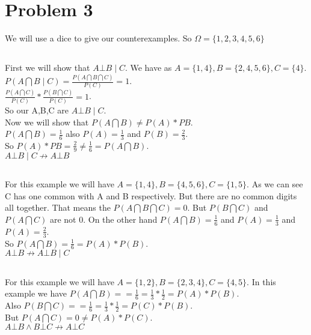 \section{Problem 3}
We will use a dice to give our counterexamples. So $\Omega = \{1,2,3,4,5,6\}$
\subsection{}
First we will show that $A\bot B \mid C$. We have as $A=\{1,4\}, B=\{2,4,5,6\}, C=\{4\}$.
$P(A\bigcap B\mid C) = \frac{P(A\bigcap B\bigcap C)}{P(C)} = 1$.\\
$\frac{P(A\bigcap C)}{P(C)} * \frac{P(B\bigcap C)}{P(C)} = 1$.\\
So our A,B,C are $A\bot B \mid C$.\\
Now we will show that $P(A\bigcap B) \neq P(A)*P{B}$.\\
$P(A\bigcap B) = \frac{1}{6}$ also $P(A) = \frac{1}{3}$ and $P(B)= \frac{2}{3}$.\\
So $P(A)*P{B} = \frac{2}{9} \neq \frac{1}{6} = P(A\bigcap B)$.\\
$A\bot B \mid C \not \rightarrow A\bot B$
\subsection{}
For this example we will have $A=\{1,4\}, B=\{4,5,6\}, C=\{1,5\}$.
As we can see C has one common with A and B respectively. But there are
no common digits all together. That means the $P(A\bigcap B\bigcap C) = 0$. But
$P(B\bigcap C)$ and $P(A\bigcap C)$ are not 0.
On the other hand $P(A\bigcap B) = \frac{1}{6}$ and $P(A) = \frac{1}{3}$ and $P(A) = \frac{2}{3}$.\\
So $P(A\bigcap B) = \frac{1}{6} = P(A)*P(B)$.\\
$A\bot B \not \rightarrow A\bot B \mid C$
\subsection{}
For this example we will have $A=\{1,2\}, B=\{2,3,4\}, C=\{4,5\}$.
In this example we have $P(A\bigcap B) = = \frac{1}{6} = \frac{1}{3} * \frac{1}{2} = P(A)*P(B)$.\\
Also $P(B\bigcap C) = = \frac{1}{6} = \frac{1}{3} * \frac{1}{2} = P(C)*P(B)$.\\
But $P(A\bigcap C) = 0 \neq P(A)*P(C)$.\\
$A\bot B \wedge  B\bot C \not \rightarrow A\bot C$

